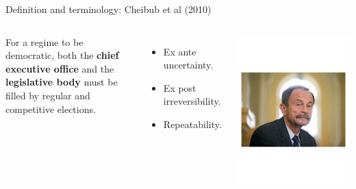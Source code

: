 \documentclass[10pt]{beamer}
\begin{document}
\begin{frame}{Definition and terminology: Cheibub et al (2010)}
	\begin{columns}
	For a regime to be democratic, both the \textbf{chief executive office} and the \textbf{legislative body} must be filled by regular and competitive elections.
	\vspace{0.2cm}
	\begin{itemize}
	\item Ex ante uncertainty.
	\item Ex post irreversibility.
	\item Repeatability.
	\end{itemize}
    \centering
    \includegraphics[scale=0.6]{Figs/as}
    \end{columns}
\end{frame}
\end{document}

